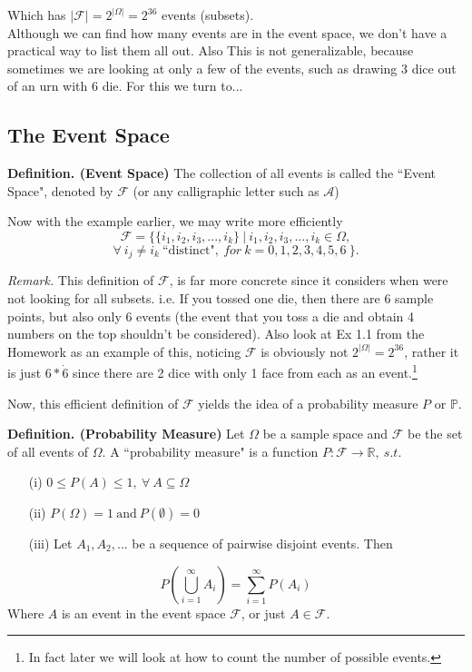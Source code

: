 \documentclass[12pt]{book}
\begin{document}
\noindent Which has $|\mathcal{F}| = 2^{|\Omega|} = 2^{36}$ events (subsets).\\

Although we can find how many events are in the event space, we don't have a practical way to list them all out. Also This is not generalizable, because sometimes we are looking at only a few of the events, such as drawing 3 dice out of an urn with 6 die. For this we turn to...

\subsection{The Event Space}

\textbf{Definition. (Event Space)} The collection of all events is called the ``Event Space", denoted by $\mathcal{F}$ (or any calligraphic letter such as $\mathcal{A}$)

Now with the example earlier, we may write more efficiently
$$\mathcal{F}=\Big\{ \{i_1, i_2, i_3, ..., i_k\} ~\Big|~ i_1, i_2, i_3, ..., i_k\in\Omega,$$
$$\forall~ i_j \neq i_k ~ \text{``distinct"}, ~ for ~ k=0,1,2,3,4,5,6~ \Big\}.$$

\textit{Remark.} This definition of $\mathcal{F}$, is far more concrete since it considers when were not looking for all subsets. 
i.e. If you tossed one die, then there are 6 sample points, but also only 6 events (the event that you toss a die and obtain 4 numbers on the top shouldn't be considered). Also look at Ex 1.1 from the Homework as an example of this, noticing $\mathcal{F}$ is obviously not $2^{|\Omega|}=2^{36}$, rather it is just $6*\dot6$ since there are 2 dice with only 1 face from each as an event.\footnote{In fact later we will look at how to count the number of possible events.}

Now, this efficient definition of $\mathcal{F}$ yields the idea of a probability measure $P$ or $\mathbb{P}$.

\noindent \textbf{Definition. (Probability Measure)} Let $\Omega$ be a sample space and $\mathcal{F}$ be the set of all events of $\Omega$. 
A ``probability measure" is a function $P: \mathcal{F} \rightarrow \mathbb{R},~s.t.$
\begin{itemize}
\item[(i)] $0\leq P(A)\leq 1,~\forall~ A\subseteq \Omega$
\item[(ii)] $P(\Omega) =1 ~\text{and}~ P(\emptyset) =0$
\item[\hypertarget{axiom(iii)}{(iii)}] Let $A_1, A_2, ...$ be a sequence of pairwise disjoint events. Then 
\end{itemize}
$$P\left( \bigcup\limits_{i=1}^{\infty} A_i\right) = \sum\limits_{i=1}^{\infty}P(A_i)$$
\noindent Where $A$ is an event in the event space $\mathcal{F}$, or just $A\in\mathcal{F}$.
\end{document}
